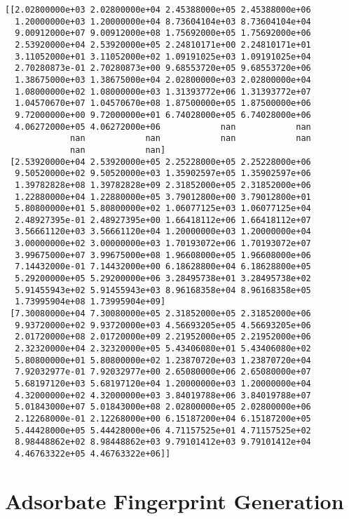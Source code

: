 \documentclass[11pt]{article}
\begin{document}
\begin{verbatim}
[[2.02800000e+03 2.02800000e+04 2.45388000e+05 2.45388000e+06
  1.20000000e+03 1.20000000e+04 8.73604104e+03 8.73604104e+04
  9.00912000e+07 9.00912000e+08 1.75692000e+05 1.75692000e+06
  2.53920000e+04 2.53920000e+05 2.24810171e+00 2.24810171e+01
  3.11052000e+01 3.11052000e+02 1.09191025e+03 1.09191025e+04
  2.70280873e-01 2.70280873e+00 9.68553720e+05 9.68553720e+06
  1.38675000e+03 1.38675000e+04 2.02800000e+03 2.02800000e+04
  1.08000000e+02 1.08000000e+03 1.31393772e+06 1.31393772e+07
  1.04570670e+07 1.04570670e+08 1.87500000e+05 1.87500000e+06
  9.72000000e+00 9.72000000e+01 6.74028000e+05 6.74028000e+06
  4.06272000e+05 4.06272000e+06            nan            nan
             nan            nan            nan            nan
             nan            nan]
 [2.53920000e+04 2.53920000e+05 2.25228000e+05 2.25228000e+06
  9.50520000e+02 9.50520000e+03 1.35902597e+05 1.35902597e+06
  1.39782828e+08 1.39782828e+09 2.31852000e+05 2.31852000e+06
  1.22880000e+04 1.22880000e+05 3.79012800e+00 3.79012800e+01
  5.80800000e+01 5.80800000e+02 1.06077125e+03 1.06077125e+04
  2.48927395e-01 2.48927395e+00 1.66418112e+06 1.66418112e+07
  3.56661120e+03 3.56661120e+04 1.20000000e+03 1.20000000e+04
  3.00000000e+02 3.00000000e+03 1.70193072e+06 1.70193072e+07
  3.99675000e+07 3.99675000e+08 1.96608000e+05 1.96608000e+06
  7.14432000e-01 7.14432000e+00 6.18628800e+04 6.18628800e+05
  5.29200000e+05 5.29200000e+06 3.28495738e+01 3.28495738e+02
  5.91455943e+02 5.91455943e+03 8.96168358e+04 8.96168358e+05
  1.73995904e+08 1.73995904e+09]
 [7.30080000e+04 7.30080000e+05 2.31852000e+05 2.31852000e+06
  9.93720000e+02 9.93720000e+03 4.56693205e+05 4.56693205e+06
  2.01720000e+08 2.01720000e+09 2.21952000e+05 2.21952000e+06
  2.32320000e+04 2.32320000e+05 5.43406080e+01 5.43406080e+02
  5.80800000e+01 5.80800000e+02 1.23870720e+03 1.23870720e+04
  7.92032977e-01 7.92032977e+00 2.65080000e+06 2.65080000e+07
  5.68197120e+03 5.68197120e+04 1.20000000e+03 1.20000000e+04
  4.32000000e+02 4.32000000e+03 3.84019788e+06 3.84019788e+07
  5.01843000e+07 5.01843000e+08 2.02800000e+05 2.02800000e+06
  2.12268000e-01 2.12268000e+00 6.15187200e+04 6.15187200e+05
  5.44428000e+05 5.44428000e+06 4.71157525e+01 4.71157525e+02
  8.98448862e+02 8.98448862e+03 9.79101412e+03 9.79101412e+04
  4.46763322e+05 4.46763322e+06]]
\end{verbatim}

\section{Adsorbate Fingerprint Generation}
\label{sec:org5202ed7}
\end{document}
